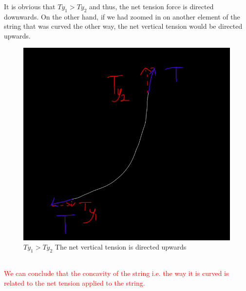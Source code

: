 \documentclass[oneside,hidelinks]{book}
\begin{document}
                It is obvious that $Ty_1 > Ty_2$ and thus, the net tension 
                force is directed downwards. On the other hand, if we had 
                zoomed in on another element of the string that was curved the other way, 
                the net vertical tension would be directed upwards.
                \begin{figure}[hbtp]
                        \caption{$Ty_1 > Ty_2$ The net vertical tension is directed upwards}                        
                        \hspace*{2cm}\includegraphics[scale=0.5]{a&b_4.png}
                \end{figure}\\

                \textcolor{red}{We can conclude that the concavity of 
                the string i.e. the way it is curved is 
                related to the net tension applied to the string.}\\
                
\end{document}
